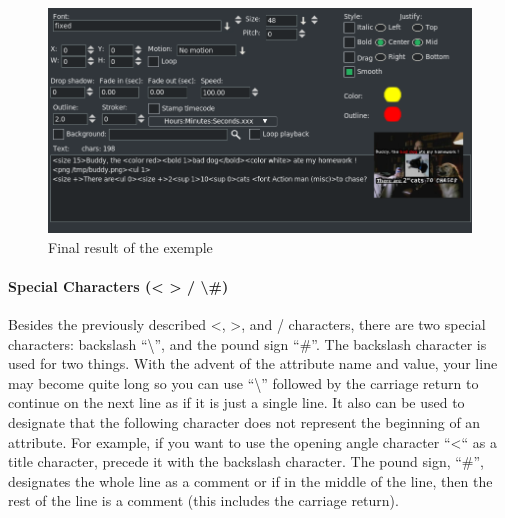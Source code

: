 {\begin{figure}[hbtp]
    \centering
    \includegraphics[width=0.9\linewidth]{images/title03.png}
    \caption{Final result of the exemple}
    \label{fig:title03}
\end{figure}

\paragraph{Special Characters (< > / \textbackslash \#)} Besides the previously described <, >, and / characters, there are two special characters: backslash “\textbackslash”, and the pound sign “\#”. The backslash character is used for two things. With the advent of the attribute name and value, your line may become quite long so you can use “\textbackslash” followed by the carriage return to continue on the next line as if it is just a single line. It also can be used to designate that the following character does not represent the beginning of an attribute. For example, if you want to use the opening angle character “<“ as a title character, precede it with the backslash character. The pound sign, “\#”, designates the whole line as a comment or if in the middle of the line, then the rest of the line is a comment (this includes the carriage return).

}
